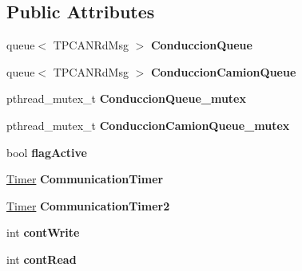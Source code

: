 \subsection*{\-Public \-Attributes}
\begin{DoxyCompactItemize}
\item 
\hypertarget{class_c_a_n_communication_aa2d7f9cb5a7e4e0c1394030dd03d080a}{queue$<$ \-T\-P\-C\-A\-N\-Rd\-Msg $>$ {\bfseries \-Conduccion\-Queue}}\label{class_c_a_n_communication_aa2d7f9cb5a7e4e0c1394030dd03d080a}

\item 
\hypertarget{class_c_a_n_communication_a90482a0006085088e5a8e200abdb39d7}{queue$<$ \-T\-P\-C\-A\-N\-Rd\-Msg $>$ {\bfseries \-Conduccion\-Camion\-Queue}}\label{class_c_a_n_communication_a90482a0006085088e5a8e200abdb39d7}

\item 
\hypertarget{class_c_a_n_communication_a615d966da4be119f6b430c3b4b835433}{pthread\-\_\-mutex\-\_\-t {\bfseries \-Conduccion\-Queue\-\_\-mutex}}\label{class_c_a_n_communication_a615d966da4be119f6b430c3b4b835433}

\item 
\hypertarget{class_c_a_n_communication_a620c2b403b0b88190feb062ce82b3207}{pthread\-\_\-mutex\-\_\-t {\bfseries \-Conduccion\-Camion\-Queue\-\_\-mutex}}\label{class_c_a_n_communication_a620c2b403b0b88190feb062ce82b3207}

\item 
\hypertarget{class_c_a_n_communication_ac3f6acd5a2f05d54d7dde46b41b67ab3}{bool {\bfseries flag\-Active}}\label{class_c_a_n_communication_ac3f6acd5a2f05d54d7dde46b41b67ab3}

\item 
\hypertarget{class_c_a_n_communication_a2ac3e9a2f03766359736929405eb5397}{\hyperlink{class_timer}{\-Timer} {\bfseries \-Communication\-Timer}}\label{class_c_a_n_communication_a2ac3e9a2f03766359736929405eb5397}

\item 
\hypertarget{class_c_a_n_communication_a13abc6674fd555962aa6adf021ffbdf9}{\hyperlink{class_timer}{\-Timer} {\bfseries \-Communication\-Timer2}}\label{class_c_a_n_communication_a13abc6674fd555962aa6adf021ffbdf9}

\item 
\hypertarget{class_c_a_n_communication_a4cd6c441b966fdf076ccb9f82fdc0949}{int {\bfseries cont\-Write}}\label{class_c_a_n_communication_a4cd6c441b966fdf076ccb9f82fdc0949}

\item 
\hypertarget{class_c_a_n_communication_a756857fc938c9b4d549c9a027e7eb6c2}{int {\bfseries cont\-Read}}\label{class_c_a_n_communication_a756857fc938c9b4d549c9a027e7eb6c2}


\end{DoxyCompactItemize}
